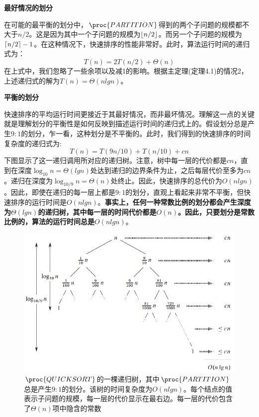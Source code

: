 \documentclass[a4paper,11pt]{ctexbook}
\begin{document}
\textbf{最好情况的划分}

在可能的最平衡的划分中，$ \proc{PARTITION} $得到的两个子问题的规模都不大于$ n/2 $。这是因为其中一个子问题的规模为$ \left\lfloor n/2 \right\rfloor $。而另一个子问题的规模为$ \lceil n/2 \rceil-1 $。在这种情况下，快速排序的性能非常好。此时，算法运行时间的递归式为：
\[
	T(n)=2T(n/2)+\Theta(n)
\]
在上式中，我们忽略了一些余项以及减1的影响。根据主定理(定理4.1)的情况2，上述递归式的解为$ T(n)=\Theta(nlgn) $。

\textbf{平衡的划分}

快速排序的平均运行时间更接近于其最好情况，而非最坏情况。理解这一点的关键就是理解划分的平衡性是如何反映到描述运行时间的递归式上的。假设划分总是产生$ 9:1 $的划分，乍一看，这种划分是不平衡的。此时，我们得到的快速排序的时间复杂度的递归式为:
\[
	T(n) = T(9n/10) + T(n/10)+cn
\]
下图显示了这一递归调用所对应的递归树。注意，树中每一层的代价都是$ cn $，直到在深度$ \log_{10}{n}=\Theta(lgn) $处达到递归的边界条件为止，之后每层代价至多为$ cn $。递归在深度为$\log_{10/9}{n}=\Theta(n) $处终止。因此，快速排序的总代价为$ O(nlgn) $。因此，即使在递归的每一层上都是$ 9:1 $的划分，直观上看起来非常不平衡，但快速排序的运行时间是$ O(nlgn) $。\textbf{事实上，任何一种常数比例的划分都会产生深度为$ \Theta(lgn) $的递归树，其中每一层的时间代价都是$ O(n) $。因此，只要划分是常数比例的，算法的运行时间总是$ O(nlgn) $}。

\begin{figure}[htbp]	
	\begin{center}
	 \includegraphics{figure/7.4.eps}	
	 \caption{$ \proc{QUICKSORT} $的一棵递归树，其中$ \proc{PARTITION} $总是产生$ 9:1 $的划分。该树的时间复杂度为$ O(nlgn) $。每个结点的值表示子问题的规模，每一层的代价显示在最右边。每一层的代价包含了$ \Theta(n) $项中隐含的常数}
	\end{center}	
\end{figure}
\end{document}
